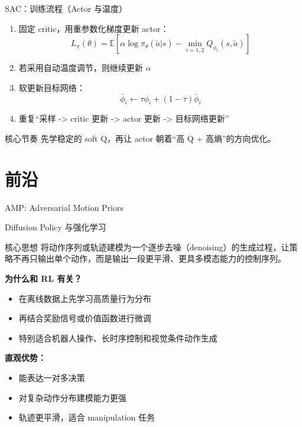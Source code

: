 \documentclass{beamer}
\begin{document}
\begin{frame}{SAC：训练流程（Actor 与温度）}
    \begin{enumerate}
        \item 固定 critic，用重参数化梯度更新 actor：
        \[
        L_\pi(\theta) = \mathbb{E}\left[\alpha \log \pi_\theta(\tilde{a}|s) - \min_{i=1,2} Q_{\phi_i}(s,\tilde{a})\right]
        \]
        \item 若采用自动温度调节，则继续更新 $\alpha$
        \item 软更新目标网络：
        \[
        \bar{\phi}_i \leftarrow \tau \phi_i + (1-\tau)\bar{\phi}_i
        \]
        \item 重复“采样 -> critic 更新 -> actor 更新 -> 目标网络更新”
    \end{enumerate}

    \begin{block}{核心节奏}
        先学稳定的 soft Q，再让 actor 朝着“高 Q + 高熵”的方向优化。
    \end{block}
\end{frame}




\section{前沿}
\begin{frame}{AMP: Adversarial Motion Priors}
\end{frame}


\begin{frame}{Diffusion Policy 与强化学习}
\begin{block}{核心思想}
    将动作序列或轨迹建模为一个逐步去噪（denoising）的生成过程，让策略不再只输出单个动作，而是输出一段更平滑、更具多模态能力的控制序列。
\end{block}

\textbf{为什么和 RL 有关？}
\begin{itemize}
    \item 在离线数据上先学习高质量行为分布
    \item 再结合奖励信号或价值函数进行微调
    \item 特别适合机器人操作、长时序控制和视觉条件动作生成
\end{itemize}

\textbf{直观优势：}
\begin{itemize}
    \item 能表达一对多决策
    \item 对复杂动作分布建模能力更强
    \item 轨迹更平滑，适合 manipulation 任务
\end{itemize}
\end{frame}
\end{document}
